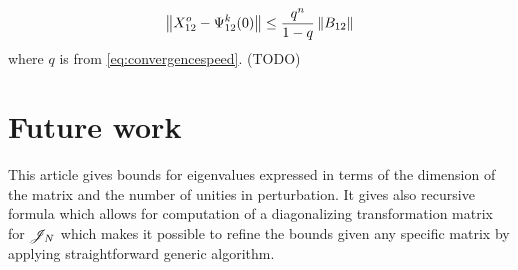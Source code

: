 \documentclass{article}
\begin{document}
\[ \left\|{X_{12}^o - \Psi_{12}^k(0)}\right\| \leq \frac{q^n}{1-q} \left\|{B_{12}}\right\| \]
where \( q \) is from \eqref{eq:convergencespeed}.
(TODO)

\section{Future work}
This article gives bounds for eigenvalues
expressed in terms of the dimension of the matrix
and the number of unities in perturbation.
It gives also recursive formula which allows for computation
of a diagonalizing transformation matrix for \( \mathscr{J}_{N} \)
which makes it possible to refine the bounds
given any specific matrix
by applying straightforward generic algorithm.
\end{document}
